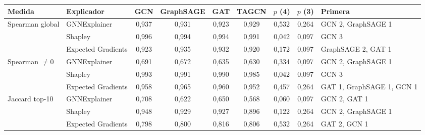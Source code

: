 \begin{tabular}{llccccccl}
\toprule
Medida & Explicador & GCN & GraphSAGE & GAT & TAGCN & $p$ (4) & $p$ (3) & Primera \\
\midrule
Spearman global & GNNExplainer & 0{,}937 & 0{,}931 & 0{,}923 & 0{,}929 & 0{,}532 & 0{,}264 & GCN 2, GraphSAGE 1 \\
 & Shapley & 0{,}996 & 0{,}994 & 0{,}994 & 0{,}991 & 0{,}042 & 0{,}097 & GCN 3 \\
 & Expected Gradients & 0{,}923 & 0{,}935 & 0{,}932 & 0{,}920 & 0{,}172 & 0{,}097 & GraphSAGE 2, GAT 1 \\
\midrule
Spearman $\neq 0$ & GNNExplainer & 0{,}691 & 0{,}672 & 0{,}635 & 0{,}630 & 0{,}334 & 0{,}097 & GCN 2, GraphSAGE 1 \\
 & Shapley & 0{,}993 & 0{,}991 & 0{,}990 & 0{,}985 & 0{,}042 & 0{,}097 & GCN 3 \\
 & Expected Gradients & 0{,}958 & 0{,}965 & 0{,}960 & 0{,}952 & 0{,}457 & 0{,}264 & GAT 1, GraphSAGE 1, GCN 1 \\
\midrule
Jaccard top-10 & GNNExplainer & 0{,}708 & 0{,}622 & 0{,}650 & 0{,}568 & 0{,}060 & 0{,}097 & GCN 2, GAT 1 \\
 & Shapley & 0{,}948 & 0{,}929 & 0{,}927 & 0{,}896 & 0{,}122 & 0{,}264 & GCN 2, GraphSAGE 1 \\
 & Expected Gradients & 0{,}798 & 0{,}800 & 0{,}816 & 0{,}806 & 0{,}532 & 0{,}264 & GAT 2, GCN 1 \\
\bottomrule
\end{tabular}
